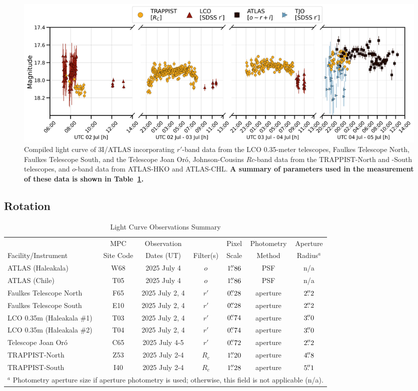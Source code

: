 \documentclass[linenumbers,twocolumn,longbib]{aastex7}
\begin{document}
\begin{figure}
\includegraphics[width=1.\linewidth]{figures/lightcurve_interstellar.png}
\caption{Compiled light curve of 3I/ATLAS incorporating $r'$-band data from the LCO 0.35-meter telescopes, Faulkes Telescope North, Faulkes Telescope South, and the Telescope Joan Or\'{o}, Johnson-Cousins $Rc$-band data from the TRAPPIST-North and -South telescopes, and $o$-band data from ATLAS-HKO and ATLAS-CHL.
{\bf A summary of parameters used in the measurement of these data is shown in Table~\ref{tab:lcfacilities}.}}
\label{fig:lc}
\end{figure}


\subsection{Rotation}\label{sec:rotation}

\begin{table}
\centering
\caption{Light Curve Observations Summary}
\begin{tabular}{lcccccc}
\hline
  & MPC & Observation &  & Pixel & Photometry & Aperture \\
Facility/Instrument & Site Code & Dates (UT) & Filter(s) & Scale & Method & Radius$^a$ \\
\hline
ATLAS (Haleakala)         & W68 & 2025 July 4    & $o$ & $1\mbox{$.\!\!^{\prime\prime}$}86$ & PSF & n/a \\
ATLAS (Chile)             & T05 & 2025 July 4    & $o$ & $1\mbox{$.\!\!^{\prime\prime}$}86$ & PSF & n/a \\
Faulkes Telescope North   & F65 & 2025 July 2, 4 & $r'$  & $0\mbox{$.\!\!^{\prime\prime}$}28$ & aperture & $2\mbox{$.\!\!^{\prime\prime}$}2$ \\
Faulkes Telescope South   & E10 & 2025 July 2, 4 & $r'$  & $0\mbox{$.\!\!^{\prime\prime}$}28$ & aperture & $2\mbox{$.\!\!^{\prime\prime}$}2$ \\
LCO 0.35m (Haleakala \#1) & T03 & 2025 July 2, 4 & $r'$  & $0\mbox{$.\!\!^{\prime\prime}$}74$ & aperture & $3\mbox{$.\!\!^{\prime\prime}$}0$ \\
LCO 0.35m (Haleakala \#2) & T04 & 2025 July 2, 4 & $r'$  & $0\mbox{$.\!\!^{\prime\prime}$}74$ & aperture & $3\mbox{$.\!\!^{\prime\prime}$}0$ \\
Telescope Joan Or{\'o}    & C65 & 2025 July 4-5  & $r'$  & $0\mbox{$.\!\!^{\prime\prime}$}72$  & aperture & $2\mbox{$.\!\!^{\prime\prime}$}2$ \\
TRAPPIST-North & Z53      & 2025 July 2-4        & $R_c$ & $1\mbox{$.\!\!^{\prime\prime}$}20$ & aperture & $4\mbox{$.\!\!^{\prime\prime}$}8$ \\
TRAPPIST-South & I40      & 2025 July 2-4        & $R_c$ & $1\mbox{$.\!\!^{\prime\prime}$}28$ & aperture & $5\mbox{$.\!\!^{\prime\prime}$}1$ \\
\hline
\multicolumn{7}{l}{$^a$ Photometry aperture size if aperture photometry is used; otherwise, this field is not applicable (n/a).}
\end{tabular}
\label{tab:lcfacilities}
\end{table}
\end{document}
